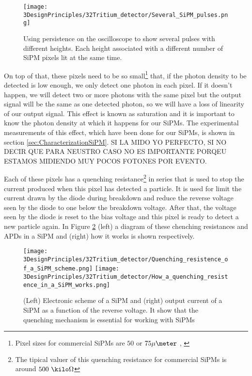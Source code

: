 \begin{figure}[htbp]
\centering
\texttt{[image: 3DesignPrinciples/32Tritium\_detector/Several\_SiPM\_pulses.png]}
\caption{Using persistence on the oscilloscope to show several pulses with different heights. Each height associated with a different number of  SiPM pixels lit at the same time.\label{fig:PulsesOfSiPM}}
\end{figure}

On top of that, these pixels need to be so small\footnote{Pixel sizes for commercial SiPMs are $50$ or $75\mu\meter$ \cite{DataSheetHammamatsu_1_SiPM_50}, \cite{DataSheetHammamatsu_1_SiPM_75}} that, if the photon density to be detected is low enough, we only detect one photon in each pixel. If it doesn't happen, we will detect two or more photons with the same pixel but the output signal will be the same as one detected photon, so we will have a loss of linearity of our output signal. This effect is known as saturation and it is important to know the photon density at which it happens for our SiPMs. The experimental measurements of this effect, which have been done for our SiPMs, is shown in section \ref{sec:CharacterizationSiPM}. SI LA MIDO YO PERFECTO, SI NO DECIR QUE PARA NEUSTRO CASO NO ES IMPORTANTE PORQEU ESTAMOS MIDIENDO MUY POCOS FOTONES POR EVENTO.

Each of these pixels has a quenching resistance\footnote{The tipical valuer of this quenching resistance for commercial SiPMs is around $500~\kilo\Omega$} in series that is used to stop the current produced when this pixel has detected a particle. It is used for limit the current drawn by the diode during breakdown and reduce the reverse voltage seen by the diode to one below the breakdown voltage. After that, the voltage seen by the diode is reset to the bias voltage and this pixel is ready to detect a new particle again. In Figure \ref{fig:ChenchingResistance} (left) a diagram of these chenching resistances and APDs in a SiPM and (right) how it works is shown respectively.

\begin{figure}[htbp]
\centering
{
\texttt{[image: 3DesignPrinciples/32Tritium\_detector/Quenching\_resistence\_of\_a\_SiPM\_scheme.png]}
}
{
\texttt{[image: 3DesignPrinciples/32Tritium\_detector/How\_a\_quenching\_resistence\_in\_a\_SiPM\_works.png]}
}
\caption{(Left) Electronic scheme of a SiPM and (right) output current of a SiPM as a function of the reverse voltage. It show that the quenching mechanism is essential for working with SiPMs\label{fig:ChenchingResistance}~\cite{DataSheetSensL}}
\end{figure}

